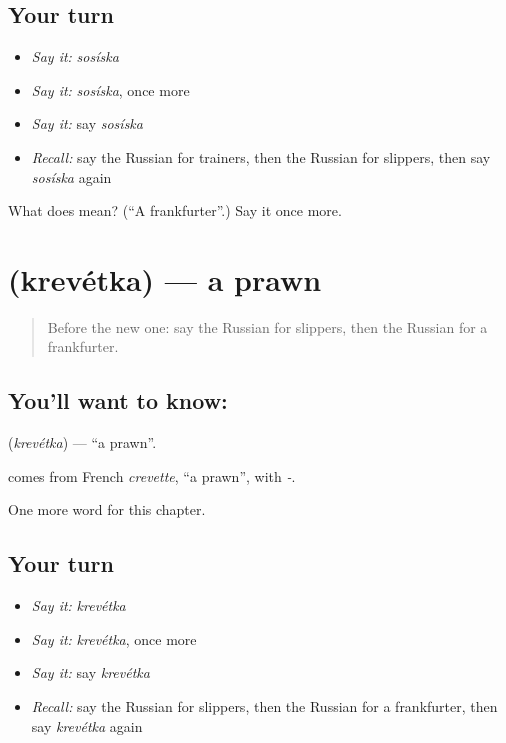 \subsection*{Your turn}
\begin{itemize}
\raggedright
  \item \emph{Say it:} \emph{sosíska}
  \item \emph{Say it:} \emph{sosíska}, once more
  \item \emph{Say it:} say \emph{sosíska}
  \item \emph{Recall:} say the Russian for trainers, then the Russian for slippers, then say \emph{sosíska} again
\end{itemize}

\begin{tcolorbox}[breakable,colback=teal!4,colframe=teal!35!black,title={Before you move on}]
What does  mean? (\textquotedblleft{}A frankfurter\textquotedblright{}.) Say it once more.
\end{tcolorbox}
\section[\texorpdfstring{\ru{креветка} (krevétka)}{креветка (krevétka)}]{ (krevétka) — a prawn}

\label{lesson:RU-C163-krevetka}



\begin{quote}
Before the new one: say the Russian for slippers, then the Russian for a frankfurter.
\end{quote}

\subsection*{You'll want to know: }
\textbf{} (\emph{krevétka}) — \textquotedblleft{}a prawn\textquotedblright{}.

\begin{cousinweb}
\textbf{} comes from French \emph{crevette}, \textquotedblleft{}a prawn\textquotedblright{}, with \emph{-}.
\end{cousinweb}

\begin{grammarlens}[title={What you've built}]
One more word for this chapter.
\end{grammarlens}

\subsection*{Your turn}
\begin{itemize}
\raggedright
  \item \emph{Say it:} \emph{krevétka}
  \item \emph{Say it:} \emph{krevétka}, once more
  \item \emph{Say it:} say \emph{krevétka}
  \item \emph{Recall:} say the Russian for slippers, then the Russian for a frankfurter, then say \emph{krevétka} again
\end{itemize}

